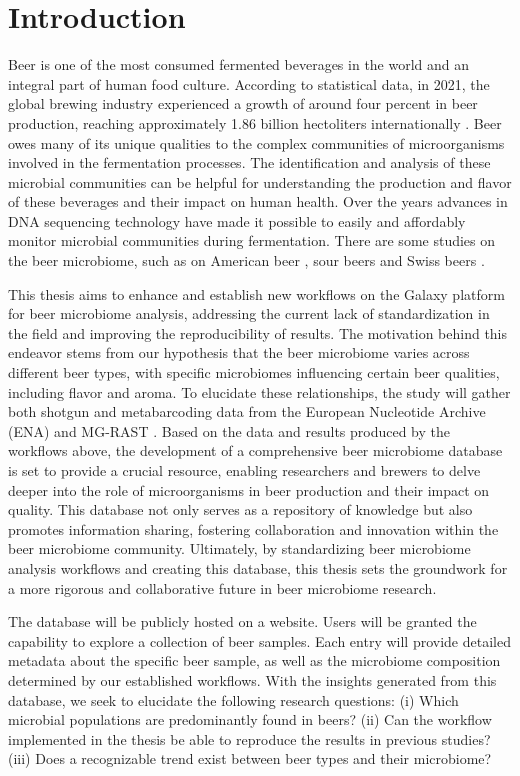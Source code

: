 \section{Introduction}
    Beer is one of the most consumed fermented beverages in the world and an integral part of human food culture. According to statistical data, in 2021, the global brewing industry experienced a growth of around four percent in beer production, reaching approximately 1.86 billion hectoliters internationally \cite{BarthHaas}. Beer owes many of its unique qualities to the complex communities of microorganisms involved in the fermentation processes. The identification and analysis of these microbial communities can be helpful for understanding the production and flavor of these beverages and their impact on human health. Over the years advances in DNA sequencing technology have made it possible to easily and affordably monitor microbial communities during fermentation. There are some studies on the beer microbiome, such as on American beer \cite{tyakht2021characteristics}, sour beers \cite{bossaert2021description} and Swiss beers \cite{sobel2017beerdecoded}.
    
    This thesis aims to enhance and establish new workflows on the Galaxy platform for beer microbiome analysis, addressing the current lack of standardization in the field and improving the reproducibility of results. The motivation behind this endeavor stems from our hypothesis that the beer microbiome varies across different beer types, with specific microbiomes influencing certain beer qualities, including flavor and aroma. To elucidate these relationships, the study will gather both shotgun and metabarcoding data from the European Nucleotide Archive (ENA) \cite{leinonen2010european} and MG-RAST \cite{keegan2016mg}. Based on the data and results produced by the workflows above, the development of a comprehensive beer microbiome database is set to provide a crucial resource, enabling researchers and brewers to delve deeper into the role of microorganisms in beer production and their impact on quality. This database not only serves as a repository of knowledge but also promotes information sharing, fostering collaboration and innovation within the beer microbiome community. Ultimately, by standardizing beer microbiome analysis workflows and creating this database, this thesis sets the groundwork for a more rigorous and collaborative future in beer microbiome research.
    
    The database will be publicly hosted on a website. Users will be granted the capability to explore a collection of beer samples. Each entry will provide detailed metadata about the specific beer sample, as well as the microbiome composition determined by our established workflows. With the insights generated from this database, we seek to elucidate the following research questions: (i) Which microbial populations are predominantly found in beers? (ii) Can the workflow implemented in the thesis be able to reproduce the results in previous studies? (iii)  Does a recognizable trend exist between beer types and their microbiome?



  